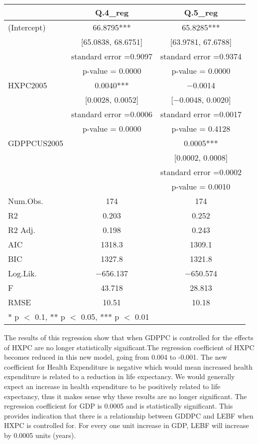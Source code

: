 \documentclass[
]{article}
\begin{document}
\begin{table}
\centering
\begin{tabular}[t]{lcc}
\toprule
  & Q.4\_reg & Q.5\_reg\\
\midrule
(Intercept) & \num{66.8795}*** & \num{65.8285}***\\
 & {}[\num{65.0838}, \num{68.6751}] & {}[\num{63.9781}, \num{67.6788}]\\
 & standard error 
=\num{0.9097} & standard error 
=\num{0.9374}\\
 & p-value = \num{0.0000} & p-value = \num{0.0000}\\
HXPC2005 & \num{0.0040}*** & \num{-0.0014}\\
 & {}[\num{0.0028}, \num{0.0052}] & {}[\num{-0.0048}, \num{0.0020}]\\
 & standard error 
=\num{0.0006} & standard error 
=\num{0.0017}\\
 & p-value = \num{0.0000} & p-value = \num{0.4128}\\
GDPPCUS2005 &  & \num{0.0005}***\\
 &  & {}[\num{0.0002}, \num{0.0008}]\\
 &  & standard error 
=\num{0.0002}\\
 &  & p-value = \num{0.0010}\\
\midrule
Num.Obs. & \num{174} & \num{174}\\
R2 & \num{0.203} & \num{0.252}\\
R2 Adj. & \num{0.198} & \num{0.243}\\
AIC & \num{1318.3} & \num{1309.1}\\
BIC & \num{1327.8} & \num{1321.8}\\
Log.Lik. & \num{-656.137} & \num{-650.574}\\
F & \num{43.718} & \num{28.813}\\
RMSE & \num{10.51} & \num{10.18}\\
\bottomrule
\multicolumn{3}{l}{\rule{0pt}{1em}* p $<$ 0.1, ** p $<$ 0.05, *** p $<$ 0.01}\\
\end{tabular}
\end{table}

The results of this regression show that when GDPPC is controlled for
the effects of HXPC are no longer statistically significant.The
regression coefficient of HXPC becomes reduced in this new model, going
from 0.004 to -0.001. The new coefficient for Health Expenditure is
negative which would mean increased health expenditure is related to a
reduction in life expectancy. We would generally expect an increase in
health expenditure to be positively related to life expectancy, thus it
makes sense why these results are no longer significant. The regression
coefficient for GDP is 0.0005 and is statistically significant. This
provides indication that there is a relationship between GDDPC and LEBF
when HXPC is controlled for. For every one unit increase in GDP, LEBF
will increase by 0.0005 units (years).
\end{document}
